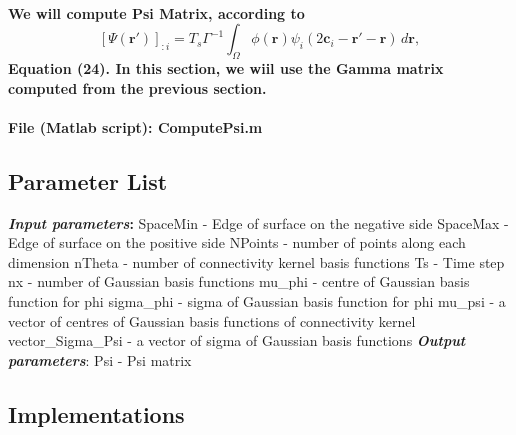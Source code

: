\documentclass[a4paper, 12pt, english]{article}
\begin{document}
\paragraph{We will compute Psi Matrix, according to
$$[\Psi(\boldsymbol{r}\prime)]_{:i}= T_s\Gamma^{-1}\int_{\Omega}\phi(\boldsymbol{r})\psi_i(2\boldsymbol{c}_i-\boldsymbol{r}\prime- \boldsymbol{r})\,d\boldsymbol{r},$$
Equation (24). In this section, we
wiil use the Gamma matrix computed from the previous section.}
\paragraph{File (Matlab script): ComputePsi.m}


\subsection{Parameter List}
\textbf{\textit{Input parameters}:}\newline
SpaceMin - Edge of surface on the negative side \newline
SpaceMax - Edge of surface on the positive side \newline
NPoints - number of points along each dimension \newline
nTheta - number of connectivity kernel basis functions \newline
Ts - Time step \newline
nx - number of Gaussian basis functions \newline
mu\_phi - centre of Gaussian basis function for phi \newline
sigma\_phi - sigma of Gaussian basis function for phi \newline
mu\_psi - a vector of centres of Gaussian basis functions of connectivity kernel \newline
vector\_Sigma\_Psi - a vector of sigma of Gaussian basis functions \newline
\textbf{\textit{Output parameters}}:\newline
Psi - Psi matrix



\subsection{Implementations}
\end{document}
